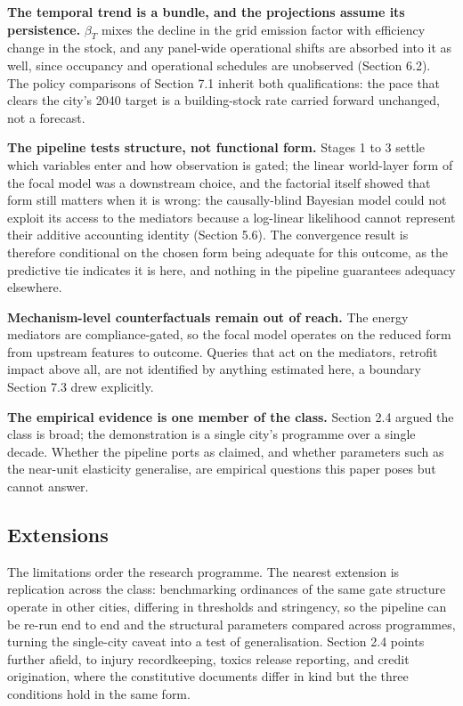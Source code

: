 \textbf{The temporal trend is a bundle, and the projections assume its persistence.} $\beta_T$ mixes the decline in the grid emission factor with efficiency change in the stock, and any panel-wide operational shifts are absorbed into it as well, since occupancy and operational schedules are unobserved (Section 6.2). The policy comparisons of Section 7.1 inherit both qualifications: the pace that clears the city's 2040 target is a building-stock rate carried forward unchanged, not a forecast.

\textbf{The pipeline tests structure, not functional form.} Stages 1 to 3 settle which variables enter and how observation is gated; the linear world-layer form of the focal model was a downstream choice, and the factorial itself showed that form still matters when it is wrong: the causally-blind Bayesian model could not exploit its access to the mediators because a log-linear likelihood cannot represent their additive accounting identity (Section 5.6). The convergence result is therefore conditional on the chosen form being adequate for this outcome, as the predictive tie indicates it is here, and nothing in the pipeline guarantees adequacy elsewhere.

\textbf{Mechanism-level counterfactuals remain out of reach.} The energy mediators are compliance-gated, so the focal model operates on the reduced form from upstream features to outcome. Queries that act on the mediators, retrofit impact above all, are not identified by anything estimated here, a boundary Section 7.3 drew explicitly.

\textbf{The empirical evidence is one member of the class.} Section 2.4 argued the class is broad; the demonstration is a single city's programme over a single decade. Whether the pipeline ports as claimed, and whether parameters such as the near-unit elasticity generalise, are empirical questions this paper poses but cannot answer.

\subsection{Extensions}

The limitations order the research programme. The nearest extension is replication across the class: benchmarking ordinances of the same gate structure operate in other cities, differing in thresholds and stringency, so the pipeline can be re-run end to end and the structural parameters compared across programmes, turning the single-city caveat into a test of generalisation. Section 2.4 points further afield, to injury recordkeeping, toxics release reporting, and credit origination, where the constitutive documents differ in kind but the three conditions hold in the same form.

